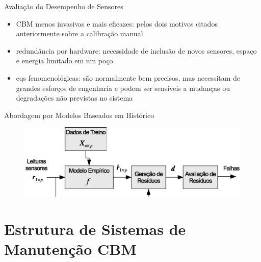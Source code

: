 \documentclass{beamer}
\begin{document}
\begin{frame}{Avaliação do Desempenho de Sensores}
{\begin{itemize}
        \item CBM menos invasivas e mais eficazes: pelos dois motivos citados
            anteriormente sobre a calibração manual
            \vspace{15pt}
        \item redundância por hardware: necessidade de inclusão de novos sensores, espaço
            e energia limitado em um poço
        \item eqs fenomenológicas: são normalmente bem precisos, mas necessitam de grandes
            esforços de engenharia e podem ser sensíveis a mudanças ou degradações não
            previstas no sistema
    \end{itemize}}
    
\end{frame}

\begin{frame}{Abordagem por Modelos Baseados em Histórico}
    
    \begin{figure}[!htb]
        \centering\hspace*{-20pt}
        \includegraphics[width=1.1\textwidth]{figuras/data_driven_fdd.eps}
    \end{figure}
    
\end{frame}


\section{Estrutura de Sistemas de Manutenção CBM}
\subsection{}
\end{document}
